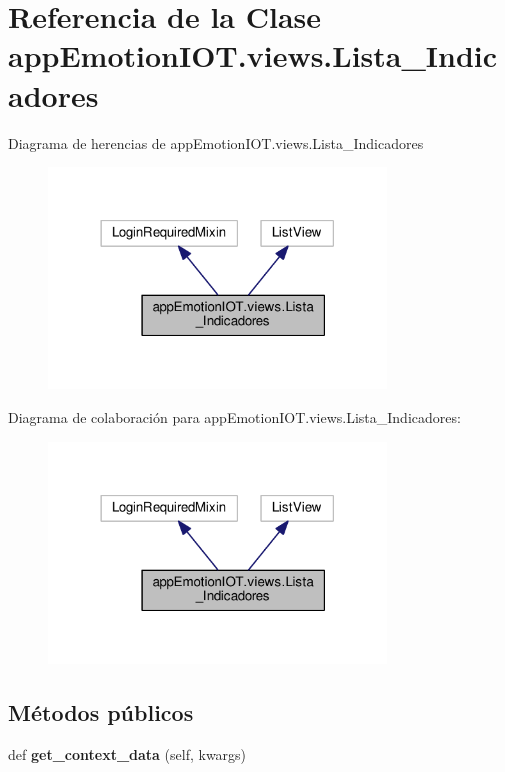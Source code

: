 \hypertarget{classappEmotionIOT_1_1views_1_1Lista__Indicadores}{}\section{Referencia de la Clase app\+Emotion\+I\+O\+T.\+views.\+Lista\+\_\+\+Indicadores}
\label{classappEmotionIOT_1_1views_1_1Lista__Indicadores}


Diagrama de herencias de app\+Emotion\+I\+O\+T.\+views.\+Lista\+\_\+\+Indicadores
\nopagebreak
\begin{figure}[H]
\begin{center}
\leavevmode
\includegraphics[width=254pt]{classappEmotionIOT_1_1views_1_1Lista__Indicadores__inherit__graph}
\end{center}
\end{figure}


Diagrama de colaboración para app\+Emotion\+I\+O\+T.\+views.\+Lista\+\_\+\+Indicadores\+:
\nopagebreak
\begin{figure}[H]
\begin{center}
\leavevmode
\includegraphics[width=254pt]{classappEmotionIOT_1_1views_1_1Lista__Indicadores__coll__graph}
\end{center}
\end{figure}
\subsection*{Métodos públicos}
\begin{DoxyCompactItemize}
\item 
def {\bfseries get\+\_\+context\+\_\+data} (self, kwargs)\hypertarget{classappEmotionIOT_1_1views_1_1Lista__Indicadores_a5738456c6f8a675161fdc1b0de75794f}{}\label{classappEmotionIOT_1_1views_1_1Lista__Indicadores_a5738456c6f8a675161fdc1b0de75794f}

\end{DoxyCompactItemize}
